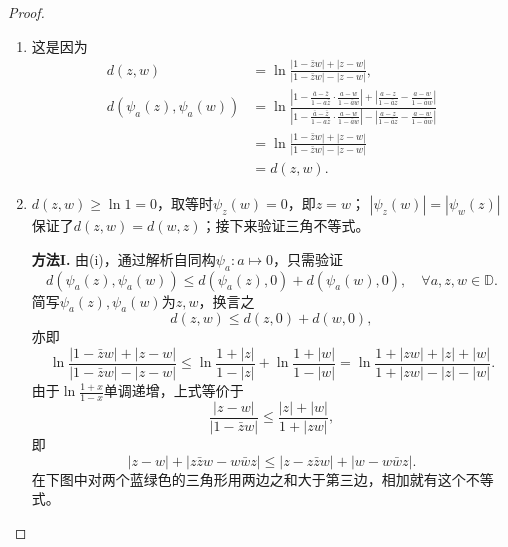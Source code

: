 \begin{proof}
    \begin{enumerate}[label=(\roman*)]
    \item 这是因为
    \begin{align*}
        d(z,w) & =
        \ln\frac{|1-\bar{z}w|+|z-w|}{|1-\bar{z}w|-|z-w|},\\
        d(\psi_{a}(z),\psi_{a}(w)) & = 
        \ln\frac{\left| 1-\frac{\bar{a}-\bar{z}}{1-a\bar{z}}
        \cdot \frac{a-w}{1-\bar{a}w} \right|+\left| \frac{a-z}{1-\bar{a}z}-\frac{a-w}{1-\bar{a}w} \right|}
        {\left| 1-\frac{\bar{a}-\bar{z}}{1-a\bar{z}}\cdot\frac{a-w}
        {1-\bar{a}w} \right|-\left| \frac{a-z}{1-\bar{a}z}-\frac{a-w}{1-\bar{a}w} \right|} \\
        & = \ln\frac{|1-\bar{z}w|+|z-w|}{|1-\bar{z}w|-|z-w|} \\
        & = d(z,w).
    \end{align*}
    
    \item $d(z,w)\geqslant\ln1=0$，取等时$\psi_z(w)=0$，即$z=w$；
    $|\psi_z(w)|=|\psi_w(z)|$保证了$d(z,w)=d(w,z)$；接下来验证三角不等式。

    \textbf{方法I.} 由(i)，通过解析自同构$\psi_a\colon a\mapsto0$，只需验证
    $$
        d(\psi_a(z),\psi_a(w))\leqslant d(\psi_a(z),0)+d(\psi_a(w),0), \quad \forall a,z,w\in \mathbb{D}.
    $$
    简写$\psi_a(z),\psi_a(w)$为$z,w$，换言之
    \[d(z,w)\leqslant d(z,0)+d(w,0),\]
    亦即
    \[\ln\frac{|1-\bar{z}w|+|z-w|}{|1-\bar{z}w|-|z-w|}
    \leqslant\ln\frac{1+|z|}{1-|z|}+\ln\frac{1+|w|}{1-|w|}
    =\ln\frac{1+|zw|+|z|+|w|}{1+|zw|-|z|-|w|}.\]
    由于$\ln\frac{1+x}{1-x}$单调递增，上式等价于
    \[\frac{|z-w|}{|1-\bar{z}w|}\leqslant\frac{|z|+|w|}{1+|zw|},\]
    即
    \[|z-w|+|z\bar{z}w-w\bar{w}z|\leqslant|z-z\bar{z}w|+|w-w\bar{w}z|.\]
    在下图中对两个蓝绿色的三角形用两边之和大于第三边，相加就有这个不等式。
    

\end{enumerate}
\end{proof}
